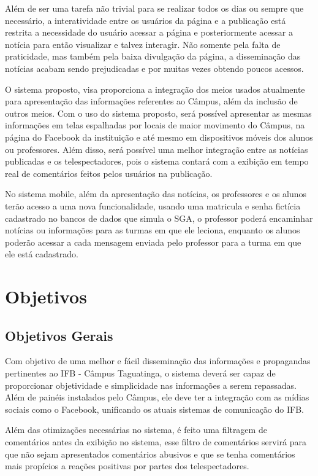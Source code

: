 Além de ser uma tarefa não trivial para se realizar todos os dias ou sempre que necessário, a interatividade entre os usuários da página e a
publicação está restrita a necessidade do usuário acessar a página e posteriormente acessar a notícia para então visualizar e talvez interagir. Não somente pela falta de praticidade, mas também pela baixa divulgação da página, a disseminação das notícias acabam sendo prejudicadas e por muitas vezes obtendo poucos acessos.

O sistema proposto, visa proporciona a integração dos meios usados atualmente para apresentação das informações referentes ao Câmpus, além da inclusão de outros meios. Com o uso do sistema proposto, será possível apresentar as mesmas informações
em telas espalhadas por locais de maior movimento do Câmpus, na página do Facebook
da instituição e até mesmo em dispositivos móveis dos alunos ou professores. Além disso, será possível uma melhor integração entre as notícias publicadas e os telespectadores, pois o sistema contará com a exibição em tempo real de comentários feitos pelos usuários na publicação.

No sistema mobile, além da apresentação das notícias, os professores e os alunos terão acesso a uma nova funcionalidade, usando uma matricula e senha fictícia cadastrado no bancos de dados que simula o SGA, o professor poderá encaminhar notícias ou informações para as turmas em que ele leciona, enquanto os alunos poderão acessar a cada mensagem enviada pelo professor para a turma em que ele está cadastrado.

\section{Objetivos}
\subsection{Objetivos Gerais}
Com objetivo de uma melhor e fácil disseminação das informações e propagandas pertinentes ao IFB - Câmpus Taguatinga, o sistema deverá ser capaz de proporcionar objetividade e simplicidade nas informações a serem repassadas. Além de painéis instalados pelo Câmpus, ele deve ter a integração com as mídias sociais como o Facebook, unificando os atuais sistemas de comunicação do IFB.

Além das otimizações necessárias no sistema, é feito uma filtragem de comentários antes da exibição no sistema, esse filtro de comentários servirá para que não sejam apresentados comentários abusivos e que se tenha comentários mais propícios a reações positivas por partes dos telespectadores.

